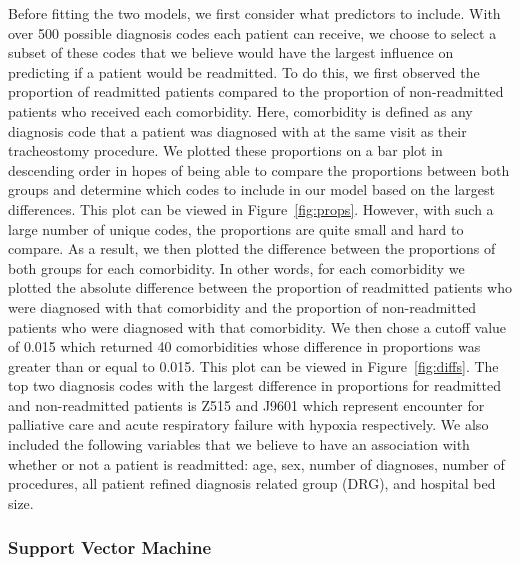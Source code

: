 \documentclass[sn-basic,pdflatex]{sn-jnl}
\theoremstyle{remark}
\theoremstyle{definition}
\begin{document}
Before fitting the two models, we first consider what predictors to
include. With over 500 possible diagnosis codes each patient can
receive, we choose to select a subset of these codes that we believe
would have the largest influence on predicting if a patient would be
readmitted. To do this, we first observed the proportion of readmitted
patients compared to the proportion of non-readmitted patients who
received each comorbidity. Here, comorbidity is defined as any diagnosis
code that a patient was diagnosed with at the same visit as their
tracheostomy procedure. We plotted these proportions on a bar plot in
descending order in hopes of being able to compare the proportions
between both groups and determine which codes to include in our model
based on the largest differences. This plot can be viewed in
Figure~\ref{fig:props}. \newline \newline However, with such a large
number of unique codes, the proportions are quite small and hard to
compare. As a result, we then plotted the difference between the
proportions of both groups for each comorbidity. In other words, for
each comorbidity we plotted the absolute difference between the
proportion of readmitted patients who were diagnosed with that
comorbidity and the proportion of non-readmitted patients who were
diagnosed with that comorbidity. We then chose a cutoff value of 0.015
which returned 40 comorbidities whose difference in proportions was
greater than or equal to 0.015. This plot can be viewed in
Figure~\ref{fig:diffs}. The top two diagnosis codes with the largest
difference in proportions for readmitted and non-readmitted patients is
Z515 and J9601 which represent encounter for palliative care and acute
respiratory failure with hypoxia respectively. \newline \newline We also
included the following variables that we believe to have an association
with whether or not a patient is readmitted: age, sex, number of
diagnoses, number of procedures, all patient refined diagnosis related
group (DRG), and hospital bed size.

\hypertarget{sec4AB}{%
\subsubsection{Support Vector Machine}\label{sec4AB}}
\end{document}
